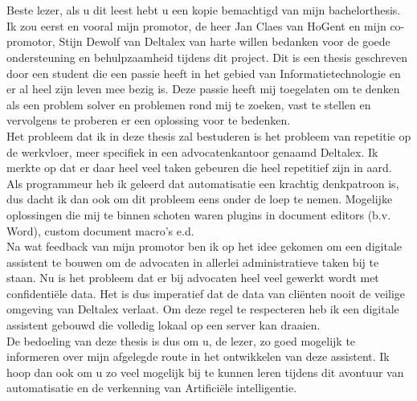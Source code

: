 
\chapter*{}%

Beste lezer, als u dit leest hebt u een kopie bemachtigd van mijn bachelorthesis. 
Ik zou eerst en vooral mijn promotor, de heer Jan Claes van HoGent en mijn co-promotor, 
Stijn Dewolf van Deltalex van harte willen bedanken voor de goede ondersteuning en behulpzaamheid tijdens dit project. 
Dit is een thesis geschreven door een student die een passie heeft in het gebied van Informatietechnologie en er al heel zijn leven mee bezig is. 
Deze passie heeft mij toegelaten om te denken als een problem solver en problemen rond mij te zoeken, vast te stellen en vervolgens te proberen er een oplossing voor te bedenken. \\

Het probleem dat ik in deze thesis zal bestuderen is het probleem van repetitie op de werkvloer, meer specifiek in een advocatenkantoor genaamd Deltalex. 
Ik merkte op dat er daar heel veel taken gebeuren die heel repetitief zijn in aard. 
Als programmeur heb ik geleerd dat automatisatie een krachtig denkpatroon is, dus dacht ik dan ook om dit probleem eens onder de loep te nemen. 
Mogelijke oplossingen die mij te binnen schoten waren plugins in document editors (b.v. Word), custom document macro's e.d. \\

Na wat feedback van mijn promotor ben ik op het idee gekomen om een digitale assistent te bouwen om de advocaten in allerlei administratieve taken bij te staan. 
Nu is het probleem dat er bij advocaten heel veel gewerkt wordt met confidentiële data. 
Het is dus imperatief dat de data van cliënten nooit de veilige omgeving van Deltalex verlaat. 
Om deze regel te respecteren heb ik een digitale assistent gebouwd die volledig lokaal op een server kan draaien. \\

De bedoeling van deze thesis is dus om u, de lezer, zo goed mogelijk te informeren over mijn afgelegde route in het ontwikkelen van deze assistent. 
Ik hoop dan ook om u zo veel mogelijk bij te kunnen leren tijdens dit avontuur van automatisatie en de verkenning van Artificiële intelligentie. 
